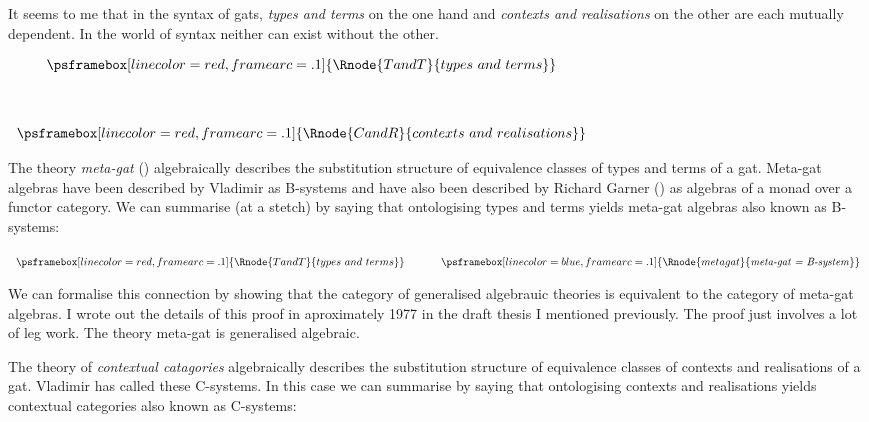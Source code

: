\documentclass[10pt,a4paper]{article}
\theoremstyle{remark}
\newcommand{\attrtype}[1]{#1}
\renewcommand{\attrtype}[1]{\psframebox[linecolor=blue,framearc=.1]{#1}}
\newcommand{\etype}[1]{#1}
\renewcommand{\etype}[1]{\psframebox[linecolor=red,framearc=.1]{#1}}
\begin{document}
\newpage
\note It seems to me that in the syntax of gats, \textit{types and terms} on the one hand and \textit{contexts and realisations} on the other are each mutually dependent. In the world 
of syntax neither can exist without the other.
\begin{center}
$
\begin{array}{ c }
\etype{\Rnode{TandT}{types\ and\ terms}} \\[1.3cm]
\etype{\Rnode{CandR}{contexts\ and\ realisations}}   
\end{array}                     
$
\setlength{\sarnodesepA}{7pt}
\setlength{\sarnodesepB}{7pt}
\setlength{\saroffsetA}{7pt}
\setlength{\saroffsetB}{7pt}
\end{center}

\note The theory \textit{meta-gat} (\cite{Cartmell14B}) algebraically describes the substitution structure of equivalence classes of types and terms of a gat. Meta-gat algebras have been described by Vladimir as B-systems and have also been described by Richard Garner (\cite{Garner15}) as algebras of a monad over a functor category.  We can summarise (at a stetch) by saying that ontologising types and terms yields meta-gat algebras also known as B-systems:

\begin{center}
$
\begin{array}{ c p{0.5cm} c}
\etype{\Rnode{TandT}{types\ and\ terms}} & & \attrtype{\Rnode{metagat}{\mbox{\textit{meta-gat = B-system}}}}
\end{array}                     
$
\setlength{\arrnodesepA}{7pt}
\setlength{\arrnodesepB}{7pt}
\end{center}

We can formalise this connection by showing that the category of generalised algebrauic theories 
is equivalent to the category of meta-gat algebras.  I wrote out the details of this proof in aproximately 1977 in the draft thesis I mentioned previously. The proof just involves a lot of leg work. The theory meta-gat is generalised algebraic.
 
\note The theory of \textit{contextual catagories} algebraically describes the substitution structure of equivalence classes of contexts and realisations of a gat. Vladimir has called  these C-systems. In this case we can summarise by saying that ontologising contexts and realisations yields contextual categories also known as C-systems:
\end{document}
